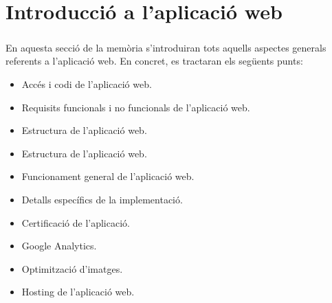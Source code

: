 \chapter{Introducció a l'aplicació web}

    \paragraph{}
    En aquesta secció de la memòria s’introduiran tots aquells aspectes generals referents a l’aplicació web. En concret, es tractaran els següents punts:

    \begin{itemize}
        \item Accés i codi de l’aplicació web.
        \item Requisits funcionals i no funcionals de l’aplicació web.
        \item Estructura de l’aplicació web.
        \item Estructura de l’aplicació web.
        \item Funcionament general de l’aplicació web.
        \item Detalls específics de la implementació.
        \item Certificació de l’aplicació.
        \item Google Analytics.
        \item Optimització d’imatges.
        \item Hosting de l’aplicació web.
    \end{itemize}

    
    
    
    
    

    
    
    
    
